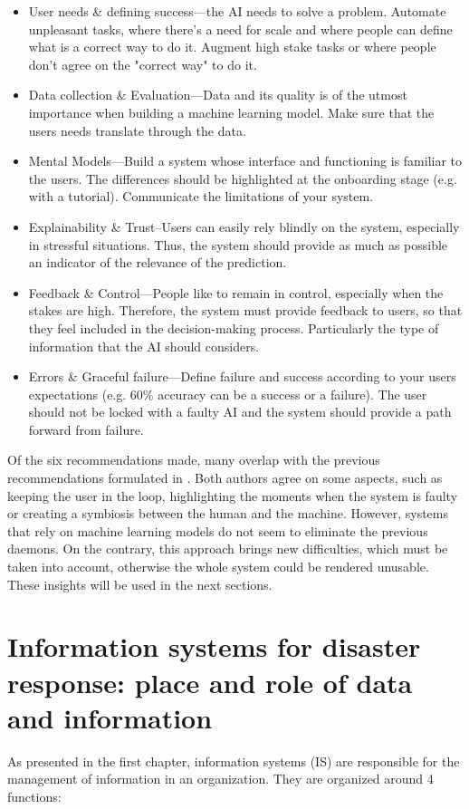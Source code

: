 \begin{itemize}
    \item User needs \& defining success—the AI needs to solve a problem.
          Automate unpleasant tasks, where there's a need for scale and where people can define what is a correct way to do it.
          Augment high stake tasks or where people don't agree on the "correct way" to do it.
    \item Data collection \& Evaluation—Data and its quality is of the utmost importance when building a machine learning model.
          Make sure that the users needs translate through the data.
    \item Mental Models—Build a system whose interface and functioning is familiar to the users.
          The differences should be highlighted at the onboarding stage (e.g. with a tutorial).
          Communicate the limitations of your system.
    \item Explainability \& Trust–Users can easily rely blindly on the system, especially in stressful situations.
          Thus, the system should provide as much as possible an indicator of the relevance of the prediction.
    \item Feedback \& Control—People like to remain in control, especially when the stakes are high.
          Therefore, the system must provide feedback to users, so that they feel included in the decision-making process.
          Particularly the type of information that the AI should considers.
    \item Errors \& Graceful failure—Define failure and success according to your users expectations (e.g. 60\% accuracy can be a success or a failure).
          The user should not be locked with a faulty AI and the system should provide a path forward from failure.
\end{itemize}

Of the six recommendations made, many overlap with the previous recommendations formulated in \textcite{endsleyDesigningSituationAwareness2016}.
Both authors agree on some aspects, such as keeping the user in the loop, highlighting the moments when the system is faulty or creating a symbiosis between the human and the machine.
However, systems that rely on machine learning models do not seem to eliminate the previous daemons.
On the contrary, this approach brings new difficulties, which must be taken into account, otherwise the whole system could be rendered unusable.
These insights will be used in the next sections.

\section{Information systems for disaster response: place and role of data and information}
As presented in the first chapter, information systems (IS) are responsible for the management of information in an organization.
They are organized around 4 functions:

